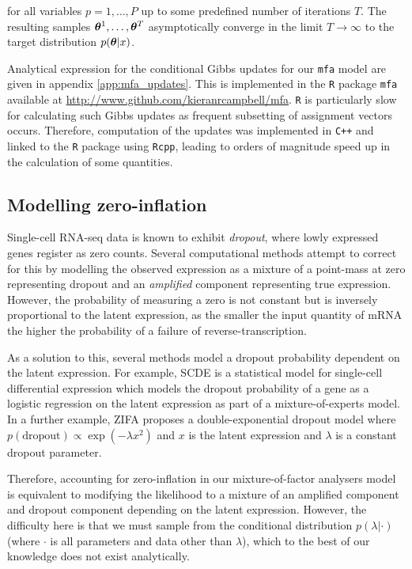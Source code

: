  for all variables $p = 1, \ldots, P$ up to some predefined number of iterations $T$. The resulting samples ${\bm \theta}^1, \ldots, \bm \theta^T$ asymptotically converge in the limit $T \rightarrow \infty$ to the target distribution $p({\bm \theta} | x)$.

Analytical expression for the conditional Gibbs updates for our \texttt{mfa} model are given in appendix \ref{app:mfa_updates}. This is implemented in the \texttt{R} package \texttt{mfa} available at \url{http://www.github.com/kieranrcampbell/mfa}. \texttt{R} is particularly slow for calculating such Gibbs updates as frequent subsetting of assignment vectors occurs. Therefore, computation of the updates was implemented in \texttt{C++} and linked to the \texttt{R} package using \texttt{Rcpp}, leading to orders of magnitude speed up in the calculation of some quantities.

\subsection{Modelling zero-inflation}

Single-cell RNA-seq data is known to exhibit \emph{dropout}, where lowly expressed genes register as zero counts. Several computational methods attempt to correct for this by modelling the observed expression as a mixture of a point-mass at zero representing dropout and an \emph{amplified} component representing true expression. However, the probability of measuring a zero is not constant but is inversely proportional to the latent expression, as the smaller the input quantity of mRNA the higher the probability of a failure of reverse-transcription.

As a solution to this, several methods model a dropout probability dependent on the latent expression. For example, SCDE \cite{Kharchenko2014} is a statistical model for single-cell differential expression which models the dropout probability of a gene as a logistic regression on the latent expression as part of a mixture-of-experts model.
In a further example, ZIFA \cite{pierson2015zifa} proposes a double-exponential dropout model where $p(\text{dropout}) \propto \exp(-\lambda x^2)$ and $x$ is the latent expression and $\lambda$ is a constant dropout parameter.

Therefore, accounting for zero-inflation in our mixture-of-factor analysers model is equivalent to modifying the likelihood to a mixture of an amplified component and dropout component depending on the latent expression. However, the difficulty here is that we must sample from the conditional distribution $p(\lambda | \cdot)$ (where $\cdot$ is all parameters and data other than $\lambda$), which to the best of our knowledge does not exist analytically.

